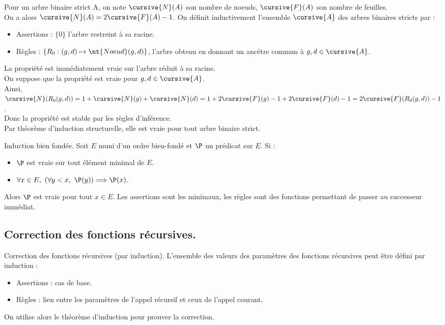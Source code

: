 \documentclass[french, 11pt]{article}
\begin{document}
\begin{ex}{}{}
    Pour un arbre binaire strict A, on note $\cursive{N}(A)$ son nombre de noeuds, $\cursive{F}(A)$ son nombre de feuilles.\\
    On a alors $\cursive{N}(A)=2\cursive{F}(A)-1$.
    \tcblower
    On définit inductivement l'ensemble $\cursive{A}$ des arbres binaires stricts par :
    \begin{itemize}
        \item Assertions : $\{0\}$ l'arbre restreint à sa racine.
        \item Règles : $\{R_0:(g,d) \mapsto \nt{Noeud}(g,d)\}$, l'arbre obtenu en donnant un ancêtre commun à $g,d\in\cursive{A}$.
    \end{itemize}
    La propriété est immédiatement vraie sur l'arbre réduit à sa racine.\\
    On suppose que la propriété est vraie pour $g,d\in\cursive{A}$.\\
    Ainsi, $\cursive{N}(R_0(g,d))=1+\cursive{N}(g)+\cursive{N}(d)=1+2\cursive{F}(g)-1+2\cursive{F}(d)-1=2\cursive{F}(R_0(g,d))-1$.\\
    Donc la propriété est stable par les règles d'inférence.\\
    Par théorème d'induction structurelle, elle est vraie pour tout arbre binaire strict.
\end{ex}

\begin{corr}{Induction bien fondée.}{}
    Soit $E$ muni d'un ordre bien-fondé et $\P$ un prédicat sur $E$. Si :
    \begin{itemize}
        \item $\P$ est vraie sur tout élément minimal de $E$.
        \item $\forall x\in E, ~ (\forall y<x, ~ \P(y)) \Longrightarrow \P(x)$.
    \end{itemize}
    Alors $\P$ est vraie pour tout $x\in E$.
    \tcblower
    Les assertions sont les minimaux, les règles sont des fonctions permettant de passer au successeur immédiat.
\end{corr}

\subsection{Correction des fonctions récursives.}

\begin{meth}{Correction des fonctions récursives (par induction).}{}
    L'ensemble des valeurs des paramètres des fonctions récursives peut être défini par induction :
    \begin{itemize}
        \item Assertions : cas de base.
        \item Règles : lien entre les paramètres de l'appel récursif et ceux de l'appel courant.
    \end{itemize}
    On utilise alors le théorème d'induction pour prouver la correction.
\end{meth}

\fin
\end{document}
